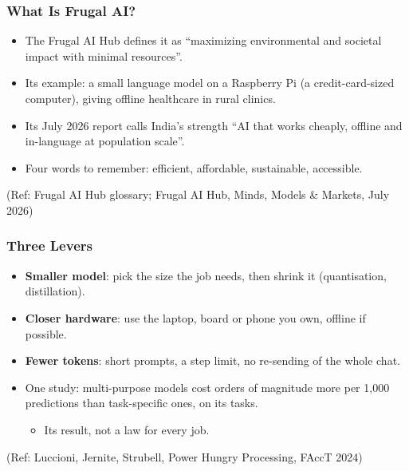 \begin{frame}[fragile]\frametitle{What Is Frugal AI?}
\begin{itemize}
\item The Frugal AI Hub defines it as ``maximizing environmental and societal impact with minimal resources''.
\item Its example: a small language model on a Raspberry Pi (a credit-card-sized computer), giving offline healthcare in rural clinics.
\item Its July 2026 report calls India's strength ``AI that works cheaply, offline and in-language at population scale''.
\item Four words to remember: efficient, affordable, sustainable, accessible.
\end{itemize}
{\tiny (Ref: Frugal AI Hub glossary; Frugal AI Hub, Minds, Models \& Markets, July 2026)}
\end{frame}

\begin{frame}[fragile]\frametitle{Three Levers}
\begin{itemize}
\item \textbf{Smaller model}: pick the size the job needs, then shrink it (quantisation, distillation).
\item \textbf{Closer hardware}: use the laptop, board or phone you own, offline if possible.
\item \textbf{Fewer tokens}: short prompts, a step limit, no re-sending of the whole chat.
\item One study: multi-purpose models cost orders of magnitude more per 1,000 predictions than task-specific ones, on its tasks.
	\begin{itemize}
	\item Its result, not a law for every job.
	\end{itemize}
\end{itemize}
{\tiny (Ref: Luccioni, Jernite, Strubell, Power Hungry Processing, FAccT 2024)}
\end{frame}
